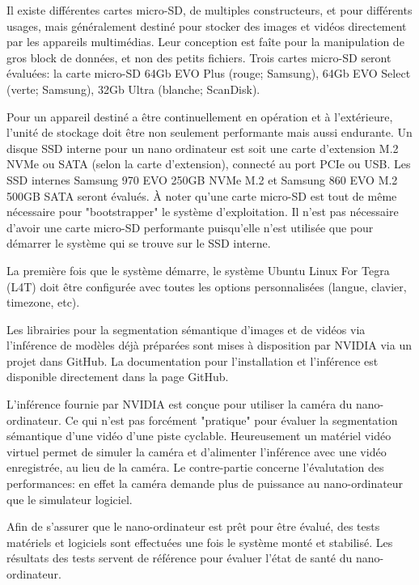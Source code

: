 \par Il existe différentes cartes micro-SD, de multiples constructeurs, et pour différents usages, mais généralement destiné pour stocker des images et vidéos directement par les appareils multimédias. Leur conception est faîte pour la manipulation de gros block de données, et non des petits fichiers. Trois cartes micro-SD 
seront évaluées: la carte micro-SD 64Gb EVO Plus (rouge; Samsung), 64Gb EVO Select (verte; Samsung), 32Gb Ultra (blanche; ScanDisk).
\par Pour un appareil destiné a être continuellement en opération et à l'extérieure, l'unité de stockage doit être non seulement performante mais aussi endurante. Un disque SSD interne pour un nano ordinateur est soit une carte d'extension M.2 NVMe ou SATA (selon la carte d'extension), connecté au port PCIe ou USB. Les SSD internes 
Samsung 970 EVO 250GB NVMe M.2 et Samsung 860 EVO M.2 500GB SATA seront évalués. À noter qu'une carte micro-SD est tout de même nécessaire pour "bootstrapper" le système d'exploitation. Il n'est pas nécessaire d'avoir une carte micro-SD performante puisqu'elle n'est utilisée que pour démarrer le système qui se trouve sur le SSD interne. 
\par La première fois que le système démarre, le système Ubuntu Linux For Tegra (L4T) doit être configurée avec toutes les options personnalisées (langue, clavier, timezone, etc).
\par Les librairies pour la segmentation sémantique 
d'images et de vidéos via l'inférence de modèles déjà préparées sont mises à disposition par NVIDIA via un projet dans GitHub. La documentation pour l'installation et l'inférence est disponible directement dans la page GitHub. 
\par L'inférence fournie par NVIDIA est conçue pour utiliser la caméra du nano-ordinateur. Ce qui n'est pas forcément "pratique" pour évaluer la segmentation sémantique d'une vidéo d'une piste cyclable. Heureusement un matériel vidéo virtuel permet de simuler la caméra et d'alimenter l'inférence avec une vidéo enregistrée, au lieu de la caméra. Le contre-partie concerne l'évalutation des performances:  en effet la caméra demande plus de puissance au nano-ordinateur que le simulateur logiciel.
\par Afin de s'assurer que le nano-ordinateur est prêt pour être évalué, des tests matériels et logiciels sont  effectuées une fois le système monté et stabilisé. Les résultats des tests servent de référence pour évaluer l'état de santé du nano-ordinateur. 
